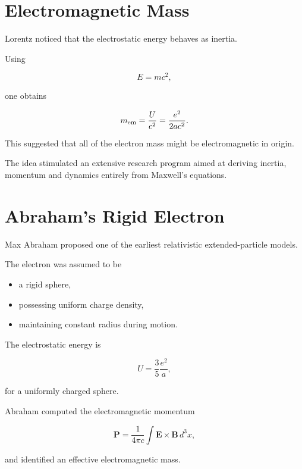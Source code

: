 \section{Electromagnetic Mass}

Lorentz noticed that the electrostatic energy behaves as inertia.

Using

\begin{equation}
E=mc^2,
\end{equation}

one obtains

\begin{equation}
m_{\rm em}
=
\frac{U}{c^2}
=
\frac{e^2}{2ac^2}.
\end{equation}

This suggested that all of the electron mass might be electromagnetic in
origin.

The idea stimulated an extensive research program aimed at deriving inertia,
momentum and dynamics entirely from Maxwell's equations.\section{Abraham's Rigid Electron}

Max Abraham proposed one of the earliest relativistic extended-particle models.

The electron was assumed to be

\begin{itemize}
\item a rigid sphere,

\item possessing uniform charge density,

\item maintaining constant radius during motion.
\end{itemize}

The electrostatic energy is

\begin{equation}
U
=
\frac35
\frac{e^2}{a},
\end{equation}

for a uniformly charged sphere.

Abraham computed the electromagnetic momentum

\begin{equation}
\mathbf P
=
\frac1{4\pi c}
\int
\mathbf E\times\mathbf B\,d^3x,
\end{equation}

and identified an effective electromagnetic mass.

